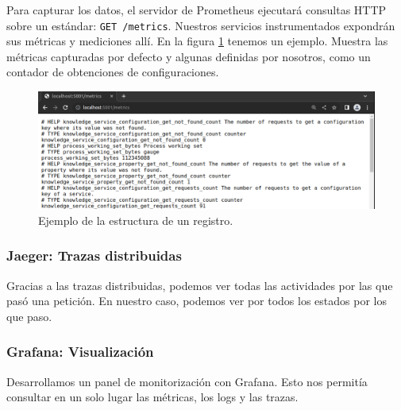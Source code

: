 Para capturar los datos, el servidor de Prometheus ejecutará consultas HTTP sobre un  estándar: \texttt{GET /metrics}. Nuestros servicios instrumentados expondrán sus métricas y mediciones allí. En la figura \ref{fig:prometheus-ejemplo-metricas} tenemos un ejemplo. Muestra las métricas capturadas por defecto y algunas definidas por nosotros, como un contador de obtenciones de configuraciones.

\begin{figure}[htb]
  \centering
  \includegraphics[scale=1.75]{cap_despliegue/images/Prometheus-Metricas-Ejemplo}
  \caption{Ejemplo de la estructura de un registro.}
  \label{fig:prometheus-ejemplo-metricas}
\end{figure}


\subsubsection{Jaeger: Trazas distribuidas}

Gracias a las trazas distribuidas, podemos ver todas las actividades por las que pasó una petición. En nuestro caso, podemos ver por todos los estados por los que paso.


\subsubsection{Grafana: Visualización}

Desarrollamos un panel de monitorización con Grafana. Esto nos permitía consultar en un solo lugar las métricas, los logs y las trazas.

